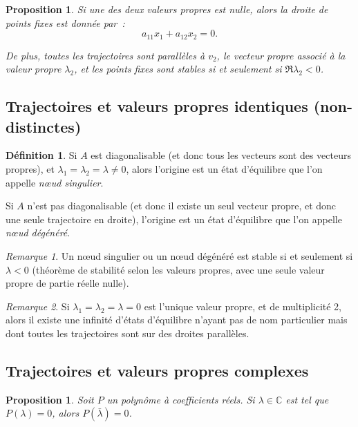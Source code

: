 \documentclass{article}
\newtheorem{prp}[thm]{Proposition}
\theoremstyle{definition}
\newtheorem{déf}[thm]{Définition}
\theoremstyle{remark}
\newtheorem*{rmq}{Remarque}
\newcommand{\C}{\mathbb C}
\begin{document}
	\begin{prp} Si une des deux valeurs propres est nulle, alors la droite de points fixes est donnée par~:
	\[a_{11}x_1 + a_{12}x_2 = 0.\]

	De plus, toutes les trajectoires sont parallèles à $v_2$, le vecteur propre associé à la valeur propre $\lambda_2$, et les points fixes sont stables si et
	seulement si $\Re\lambda_2 < 0$.
	\end{prp}

	\subsection{Trajectoires et valeurs propres identiques (non-distinctes)}

	\begin{déf} Si $A$ est diagonalisable (et donc tous les vecteurs sont des vecteurs propres), et $\lambda_1 = \lambda_2 = \lambda \neq 0$, alors l'origine
	est un état d'équilibre que l'on appelle \textit{nœud singulier}.

	Si $A$ n'est pas diagonalisable (et donc il existe un seul vecteur propre, et donc une seule trajectoire en droite), l'origine est un état d'équilibre
	que l'on appelle \textit{nœud dégénéré}.
	\end{déf}

	\begin{rmq} Un nœud singulier ou un nœud dégénéré est stable si et seulement si $\lambda < 0$ (théorème de stabilité selon les valeurs propres, avec une
	seule valeur propre de partie réelle nulle).
	\end{rmq}


	\begin{rmq} Si $\lambda_1 = \lambda_2 = \lambda = 0$ est l'unique valeur propre, et de multiplicité 2, alors il existe une infinité d'états d'équilibre
	n'ayant pas de nom particulier mais dont toutes les trajectoires sont sur des droites parallèles.
	\end{rmq}

	\subsection{Trajectoires et valeurs propres complexes}

	\begin{prp}\label{prp:polynômeracinecomplexeconjugée} Soit $P$ un polynôme à coefficients réels. Si $\lambda \in \C$ est tel que $P(\lambda) = 0$, alors
	$P(\bar \lambda) = 0$.
	\end{prp}
\end{document}
